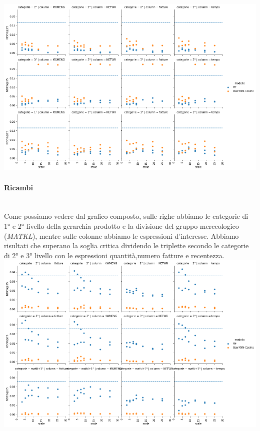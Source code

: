 \includegraphics[width=16cm]{figures/risultati_ordered_categoria_macchine.png}
\newpage

\paragraph{Ricambi}\mbox{} \\
Come possiamo vedere dal grafico composto, sulle righe abbiamo le categorie di 1° e 2° livello della gerarchia prodotto e la divisione del gruppo merceologico (\textit{MATKL}), mentre sulle colonne abbiamo le espressioni d'interesse. Abbiamo risultati che superano la soglia critica dividendo le triplette secondo le categorie di 2° e 3° livello con le espressioni quantità,numero fatture e recentezza.\\

\includegraphics[width=16cm]{figures/risultati_ordered_categoria_ricambi.png}

